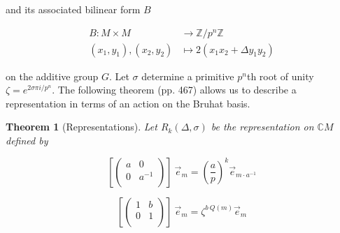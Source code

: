 \documentclass[12pt,reqno]{amsart}
\newtheorem{theorem}{Theorem}[section]
\theoremstyle{remark}
\numberwithin{table}{section}
\newcommand{\C}{\mathbb C}
\newcommand{\Z}{\mathbb Z}
\begin{document}
\noindent and its associated bilinear form $B$

\[ \begin{aligned} 
B: M \times M & \to \Z/p^n\Z    \\ 
(x_1,y_1), (x_2,y_2) & \mapsto 2(x_1x_2 + \Delta y_1y_2) 
\end{aligned} \]

\noindent on the additive group $G$.
Let $\sigma$ determine a primitive $p^n$th root of unity $\zeta= e^{2\sigma \pi i/p^n}$. The following theorem \cite{nobs1976irreduziblenp1} (pp. 467) allows us to describe a representation in terms of an action on the Bruhat basis. 
\begin{theorem}[Representations] Let $R_k(\Delta, \sigma)$ be the representation on $\C M$ defined by








\begin{equation}\label{eq:a} \left [ \left ( \begin{array}{cc}
a & 0 \\
0 & a^{-1} \\
\end{array} \right ) \right ] \:  \vec{e}_{m}  = \left ( \frac{a}{p} \right )^k {\vec{e}_{m \cdot a^{-1}}} \end{equation}



\begin{equation}\label{eq:b} \left [ \left(
\begin{array}{cc}
1 & b \\
0 & 1 \\
\end{array} \right) \right ] \:   \vec{e}_{m} =  \zeta ^{b  \: Q(m)}  \vec{e}_{m} \end{equation}



\end{theorem}
\end{document}
